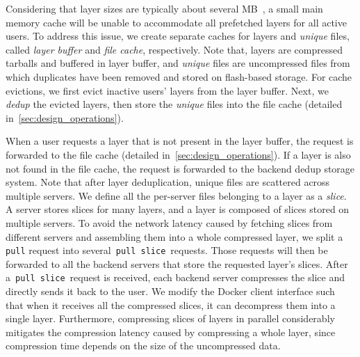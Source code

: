 

Considering that layer sizes are typically about several MB~\cite{dockerworkload}, 
a small main memory cache will be unable to accommodate
all prefetched layers for all active users. 
To address this issue, we 
create separate caches for layers and \emph{unique} files, called {\em layer buffer} and {\em file cache}, respectively. 
Note that, layers are  compressed tarballs and buffered in layer buffer, and 
 \emph{unique} files are uncompressed files from which duplicates have been removed and stored on flash-based storage. 
For 
cache evictions, we first evict inactive users' layers from the layer buffer.
Next, we \emph{dedup} the evicted layers, then store the \emph{unique} files
into the file cache (detailed in~\cref{sec:design_operations}). 

When a user requests a
layer that is not present in the layer buffer, the request is forwarded to the
file cache (detailed in~\cref{sec:design_operations}). 
If a layer is also not found in the
file cache, the request is forwarded to the backend dedup storage system.
Note that after layer deduplication, unique files are
scattered across multiple servers. 
We define all the per-server files belonging to a layer as a {\em slice}. 
A server stores slices for many layers, and a layer is composed of slices stored on multiple servers.
To avoid the network latency caused by fetching slices from different servers and
assembling them into a whole compressed layer, we split a \texttt{pull} request 
into several~\texttt{pull slice}~requests. Those requests will then be
forwarded to all the backend servers that store the requested
layer's slices. 
After a~\texttt{pull slice}~request is received, each backend server compresses the slice 
and directly sends it back to the user.
We modify the Docker client
interface such that when it receives all the compressed slices, it can
decompress them into a single layer. 
Furthermore, compressing slices
of layers in parallel considerably mitigates the compression latency caused by
compressing a whole layer, since compression time depends on the size of the
uncompressed data.



 
